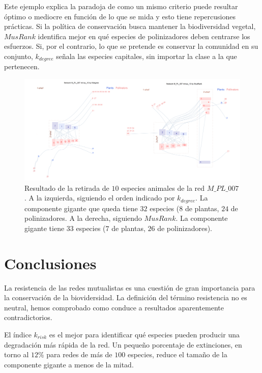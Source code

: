 Este ejemplo explica la paradoja de como un mismo criterio puede resultar óptimo o mediocre en función de lo que se mida y esto tiene repercusiones prácticas. Si la política de conservación busca mantener la biodiversidad vegetal, $MusRank$  identifica mejor en qué especies de polinizadores deben
centrarse los esfuerzos. Si, por el contrario, lo que se pretende es conservar la comunidad en su conjunto, ${k}_{degree}$ señala las especies capitales, sin importar la clase a la que pertenecen.

\begin{figure}[htp!]
\centering
\includegraphics[scale=0.26]{Figures/DEST_destruccion_PL007.png}
\caption {Resultado de la retirada de $10$ especies animales de la red $M\_PL\_007$. A la izquierda, siguiendo el orden indicado por ${k}_{degree}$. La componente gigante que queda tiene $32$ especies ($8$ de plantas, $24$ de polinizadores. A la derecha, siguiendo $MusRank$. La componente gigante tiene $33$ especies ($7$ de plantas, $26$ de polinizadores).}
\label{fig:DEST_destruccion_PL007.png}
\end{figure}


\section{Conclusiones}

La resistencia de las redes mutualistas es una cuestión de gran importancia para la conservación de la biovidersidad. La definición del término resistencia no es neutral, hemos comprobado como conduce a resultados aparentemente contradictorios.

El índice ${k}_{risk}$ es el mejor para identificar qué especies pueden producir una degradación más rápida de la red. Un pequeño porcentaje de extinciones, en torno al $12\%$ para redes de más de $100$ especies, reduce el tamaño de la componente gigante a menos de la mitad.  

